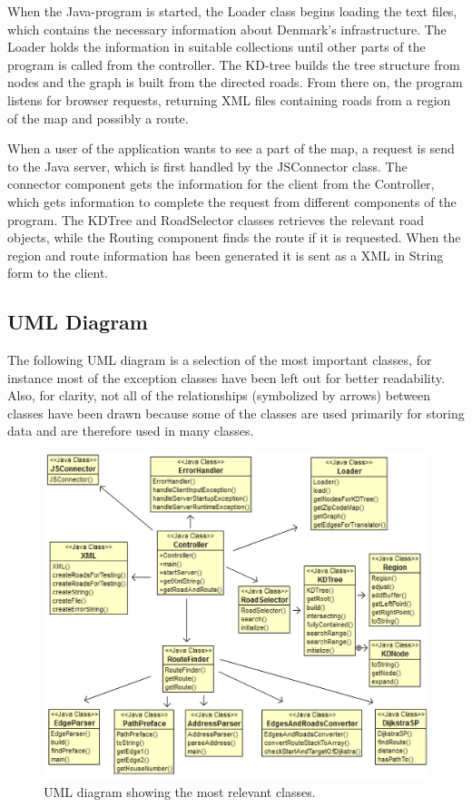 \documentclass[a4paper,10pt,titlepage]{article}
\begin{document}
		When the Java-program is started, the Loader class begins loading the text files, which contains the necessary information about Denmark's infrastructure. The Loader holds the information in suitable collections until other parts of the program is called from the controller. The KD-tree builds the tree structure from nodes and the graph is built from the directed roads. From there on, the program listens for browser requests, returning XML files containing roads from a region of the map and possibly a route.

When a user of the application wants to see a part of the map, a request is send to the Java server, which is first handled by the JSConnector class.  The connector component gets the information for the client from the Controller, which gets information to complete the request from different components of the program. The KDTree and RoadSelector classes retrieves the relevant road objects, while the Routing component finds the route if it is requested. When the region and route information has been generated it is sent as a XML in String form to the client. 

		\subsection{UML Diagram}
		The following UML diagram is a selection of the most important classes, for instance most of the exception classes have been left out for better readability. Also, for clarity, not all of the relationships (symbolized by arrows) between classes have been drawn because some of the classes are used primarily for storing data and are therefore used in many classes. 
		\begin{figure}[H]
\includegraphics[width=120mm]{umlArrows.png}
\caption{UML diagram showing the most relevant classes.}
\label{fig:uml}
\end{figure}
		
\end{document}
